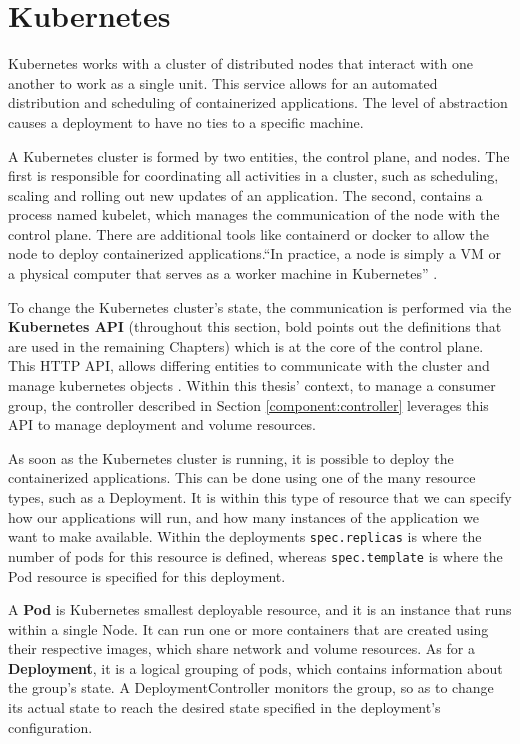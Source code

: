 \section{Kubernetes} \label{subsec:kubernetes}

Kubernetes works with a cluster of distributed nodes that interact with one
another to work as a single unit. This service allows for an automated
distribution and scheduling of containerized applications. The level of
abstraction causes a deployment to have no ties to a specific machine.

A Kubernetes cluster is formed by two entities, the control plane, and nodes. The
first is responsible for coordinating all activities in a cluster, such as
scheduling, scaling and rolling out new updates of an application. The second,
contains a process named kubelet, which manages the communication of the node
with the control plane. There are additional tools like containerd or docker to
allow the node to deploy containerized applications.``In practice, a node is
simply a VM or a physical computer that serves as a worker machine in
Kubernetes'' \cite{CreateKubeCluster}.

To change the Kubernetes cluster's state, the communication is performed via the
\textbf{Kubernetes API} (throughout this section, bold points out the
definitions that are used in the remaining Chapters) which is at the core of the
control plane. This HTTP API, allows differing entities to communicate with the
cluster and manage kubernetes objects \cite{KubernetesAPI}. Within this thesis'
context, to manage a consumer group, the controller described in Section
\ref{component:controller} leverages this API to manage deployment and volume
resources.

As soon as the Kubernetes cluster is running, it is possible to deploy the
containerized applications. This can be done using one of the many resource
types, such as a Deployment. It is within this type of resource that we can
specify how our applications will run, and how many instances of the application
we want to make available. Within the deployments \lstinline{spec.replicas} is
where the number of pods for this resource is defined, whereas
\lstinline{spec.template} is where the Pod resource is specified for this
deployment. 

A \textbf{Pod} is Kubernetes smallest deployable resource, and it is
an instance that runs within a single Node. It can run one or more containers
that are created using their respective images, which share network and volume
resources. As for a \textbf{Deployment}, it is a logical grouping of pods, which
contains information about the group's state. A DeploymentController monitors
the group, so as to change its actual state to reach the desired state specified
in the deployment's configuration.

